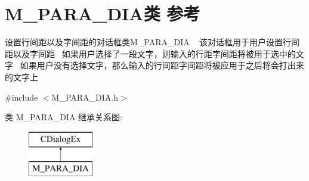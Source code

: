 \hypertarget{class_m___p_a_r_a___d_i_a}{}\section{M\+\_\+\+P\+A\+R\+A\+\_\+\+D\+I\+A类 参考}
\label{class_m___p_a_r_a___d_i_a}


设置行间距以及字间距的对话框类\+M\+\_\+\+P\+A\+R\+A\+\_\+\+D\+IA ~\newline
该对话框用于用户设置行间距以及字间距~\newline
如果用户选择了一段文字，则输入的行距字间距将被用于选中的文字~\newline
如果用户没有选择文字，那么输入的行间距字间距将被应用于之后将会打出来的文字上~\newline
 




{\ttfamily \#include $<$M\+\_\+\+P\+A\+R\+A\+\_\+\+D\+I\+A.\+h$>$}

类 M\+\_\+\+P\+A\+R\+A\+\_\+\+D\+IA 继承关系图\+:\begin{figure}[H]
\begin{center}
\leavevmode
\includegraphics[height=2.000000cm]{class_m___p_a_r_a___d_i_a}
\end{center}
\end{figure}
